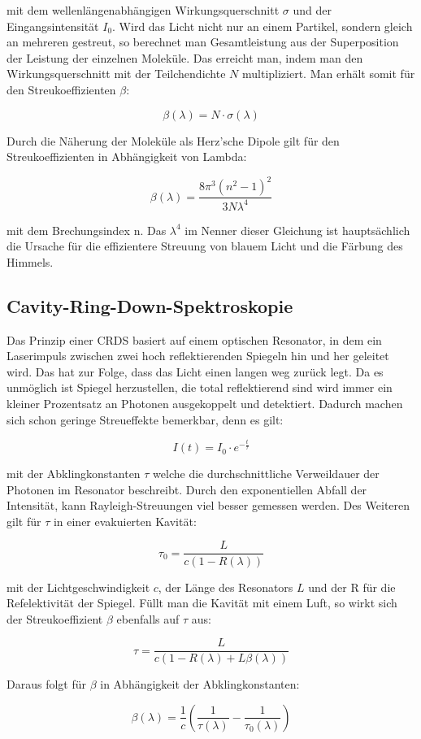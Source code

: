 mit dem wellenlängenabhängigen Wirkungsquerschnitt $\sigma$ und der Eingangsintensität $I_0$. Wird das Licht nicht nur an einem Partikel, sondern gleich an mehreren gestreut, so berechnet man Gesamtleistung aus der Superposition der Leistung der einzelnen Moleküle. Das erreicht man, indem man den Wirkungsquerschnitt mit der Teilchendichte $N$ multipliziert. Man erhält somit für den Streukoeffizienten $\beta$:

\begin{equation}
\beta(\lambda)= N \cdot \sigma(\lambda)
\end{equation}

Durch die Näherung der Moleküle als Herz'sche Dipole gilt für den Streukoeffizienten in Abhängigkeit von Lambda:

\begin{equation}
\beta(\lambda)= \frac{8\pi^3(n^2-1)^2}{3N\lambda^4}
\end{equation}

mit dem Brechungsindex n. Das $\lambda^4$ im Nenner dieser Gleichung ist hauptsächlich die Ursache für die effizientere Streuung von blauem Licht und die Färbung des Himmels. 

\subsection{Cavity-Ring-Down-Spektroskopie}
Das Prinzip einer CRDS basiert auf einem optischen Resonator, in dem ein Laserimpuls zwischen zwei hoch reflektierenden Spiegeln hin und her geleitet wird. Das hat zur Folge, dass das Licht einen langen weg zurück legt. Da es unmöglich ist Spiegel herzustellen, die total reflektierend sind wird immer ein kleiner Prozentsatz an Photonen ausgekoppelt und detektiert. Dadurch machen sich schon geringe Streueffekte bemerkbar, denn es gilt:

\begin{equation}
I(t)=I_0 \cdot e^{-\frac{t}{\tau}}
\end{equation}

mit der Abklingkonstanten $\tau$ welche die durchschnittliche Verweildauer der Photonen im Resonator beschreibt. Durch den exponentiellen Abfall der Intensität, kann Rayleigh-Streuungen viel besser gemessen werden. Des Weiteren gilt für $\tau$ in einer evakuierten Kavität:

\begin{equation}
\tau_{0}=\frac{L}{c(1-R(\lambda))}
\end{equation}

mit der Lichtgeschwindigkeit $c$, der Länge des Resonators $L$ und der R für die Refelektivität der Spiegel. Füllt man die Kavität mit einem Luft, so wirkt sich der Streukoeffizient $\beta$ ebenfalls auf $\tau$ aus:

\begin{equation}
\tau= \frac{L}{c(1-R(\lambda)+L\beta(\lambda))}
\end{equation}

Daraus folgt für $\beta$ in Abhängigkeit der Abklingkonstanten:

\begin{equation}
\beta(\lambda)=\frac{1}{c}\left(\frac{1}{\tau(\lambda)}-\frac{1}{\tau_0(\lambda)}\right)
\end{equation}
